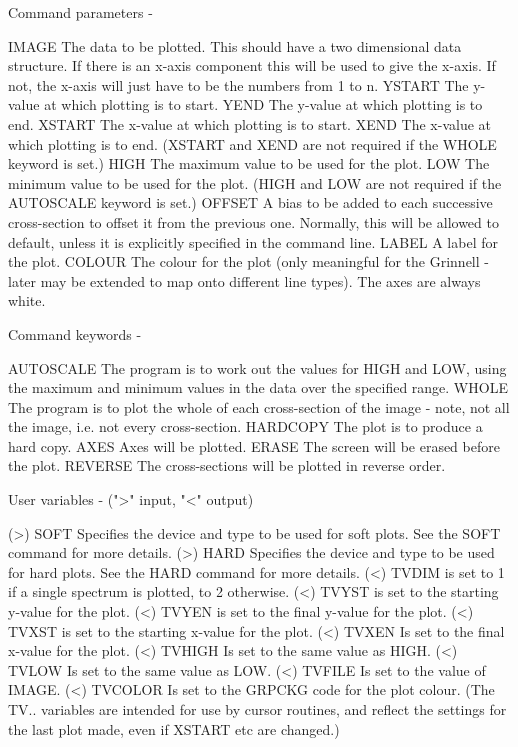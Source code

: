 \begin{description}
\begin{description}
\begin{terminalv}
 Command parameters -

 IMAGE       The data to be plotted.  This should have a
           two dimensional data structure. If there
             is an x-axis component this will be used to
             give the x-axis.  If not, the x-axis will just
             have to be the numbers from 1 to n.
 YSTART      The y-value at which plotting is to start.
 YEND        The y-value at which plotting is to end.
 XSTART      The x-value at which plotting is to start.
 XEND        The x-value at which plotting is to end.
             (XSTART and XEND are not required if the
             WHOLE keyword is set.)
 HIGH        The maximum value to be used for the plot.
 LOW         The minimum value to be used for the plot.
             (HIGH and LOW are not required if the
             AUTOSCALE keyword is set.)
 OFFSET      A bias to be added to each successive cross-section
             to offset it from the previous one.  Normally, this
             will be allowed to default, unless it is explicitly
             specified in the command line.
 LABEL       A label for the plot.
 COLOUR      The colour for the plot (only meaningful for the
             Grinnell - later may be extended to map onto
             different line types).  The axes are always white.

 Command keywords -

 AUTOSCALE   The program is to work out the values for HIGH
             and LOW, using the maximum and minimum values
             in the data over the specified range.
 WHOLE       The program is to plot the whole of each cross-section
             of the image - note, not all the image, i.e. not every
             cross-section.
 HARDCOPY    The plot is to produce a hard copy.
 AXES        Axes will be plotted.
 ERASE       The screen will be erased before the plot.
 REVERSE     The cross-sections will be plotted in reverse order.

 User variables -    (">" input, "<" output)

 (>) SOFT    Specifies the device and type to be used for soft
             plots.  See the SOFT command for more details.
 (>) HARD    Specifies the device and type to be used for hard
             plots.  See the HARD command for more details.
 (<) TVDIM   is set to 1 if a single spectrum is plotted, to
             2 otherwise.
 (<) TVYST   is set to the starting y-value for the plot.
 (<) TVYEN   is set to the final y-value for the plot.
 (<) TVXST   is set to the starting x-value for the plot.
 (<) TVXEN   Is set to the final x-value for the plot.
 (<) TVHIGH  Is set to the same value as HIGH.
 (<) TVLOW   Is set to the same value as LOW.
 (<) TVFILE  Is set to the value of IMAGE.
 (<) TVCOLOR Is set to the GRPCKG code for the plot colour.
             (The TV.. variables are intended for use by
             cursor routines, and reflect the settings for the
             last plot made, even if XSTART etc are changed.)


\end{terminalv}
\end{description}
\end{description}
